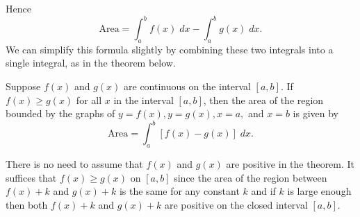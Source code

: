 \documentclass{ximera}
\begin{document}
Hence
\[
\text{Area} = \int_a^b f(x) \; dx - \int_a^b g(x) \; dx.
\]
We can simplify this formula slightly by combining these two integrals into a single integral, as in the theorem below. 


\begin{theorem}
Suppose $f(x)$ and $g(x)$ are continuous on the interval $[a,b]$. If $f(x) \geq g(x)$ for all $x$ in the interval $[a,b]$, 
then the area of the region bounded by the graphs of $y = f(x), y=g(x), x=a,$ and $x=b$ is given by  
\[
\text{Area} = \int_a^b \left[f(x) -g(x)\right] \; dx.
\]
\end{theorem}


\begin{remark}
There is no need to assume that $f(x)$ and $g(x)$ are positive in the theorem.  It suffices that $f(x) \geq g(x)$ on $[a,b]$ since the area of the region between 
$f(x) + k$ and $g(x) + k$ is the same for any constant $k$ and if $k$ is large enough then both $f(x) + k$ and $g(x) + k$ are positive
on the closed interval $[a,b]$.
\end{remark}

\begin{center}
\end{center}
\end{document}
